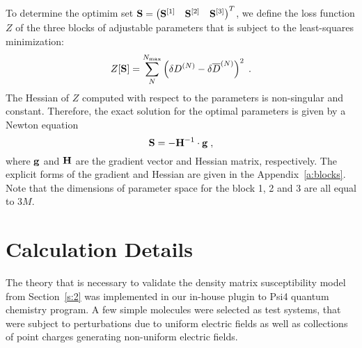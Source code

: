 \documentclass[aip,graphicx]{revtex4-1}
\begin{document}
To determine the optimim set 
$
 {\bf S} = 
\begin{pmatrix}
{\bf S}^{[1]} &
{\bf S}^{[2]} &
{\bf S}^{[3]}
\end{pmatrix}^T
$, we define the loss function $Z$ 
of the three blocks of adjustable parameters
that is subject to the least\hyp{}squares minimization:
%
\begin{equation}\label{e:Z}
 Z[{\bf S}] = \sum_N^{N_{\rm max}} \left( \delta D^{(N)} - \delta \overline{D}^{(N)} \right)^2 \;.
\end{equation}
%
The Hessian of $Z$ computed with respect to the parameters is non\hyp{}singular 
and constant.
Therefore, the exact solution for the optimal parameters is given by a Newton equation
%
\begin{equation}\label{e:Newton}
 {\bf S} = -{\bf H}^{-1} \cdot {\bf g} \;,
\end{equation}
%
where ${\bf g}$ and ${\bf H}$ are the gradient vector and Hessian matrix, respectively.
%
%
The explicit forms of the gradient and Hessian are given in the Appendix~\ref{a:blocks}.
Note that the dimensions of parameter space for the block 1, 2 and 3 are all
equal to $3M$.

\section{\label{s:3}Calculation Details}

The theory that is necessary to validate the density matrix susceptibility model from Section~\ref{s:2}
was implemented in our in\hyp{}house plugin to Psi4 quantum chemistry program.
A few simple molecules were selected as test systems, that were subject to 
perturbations due to uniform electric fields as well as collections of point charges
generating non\hyp{}uniform electric fields. 
\end{document}

